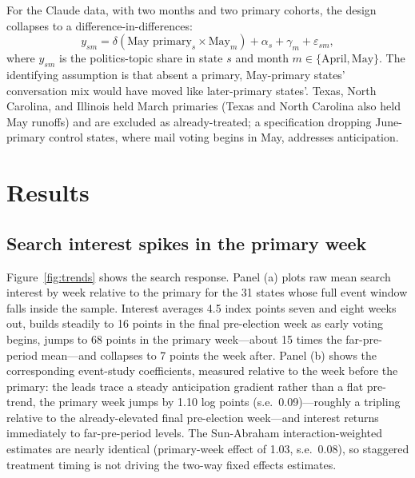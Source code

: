 \documentclass[12pt]{article}
\begin{document}
For the Claude data, with two months and two primary cohorts, the design collapses to a difference-in-differences:
\begin{equation}
y_{sm} = \delta \left(\text{May primary}_s \times \text{May}_m\right) + \alpha_s + \gamma_m + \varepsilon_{sm},
\end{equation}
where $y_{sm}$ is the politics-topic share in state $s$ and month $m \in \{\text{April}, \text{May}\}$. The identifying assumption is that absent a primary, May-primary states' conversation mix would have moved like later-primary states'. Texas, North Carolina, and Illinois held March primaries (Texas and North Carolina also held May runoffs) and are excluded as already-treated; a specification dropping June-primary control states, where mail voting begins in May, addresses anticipation.

\section*{Results}

\subsection*{Search interest spikes in the primary week}

Figure~\ref{fig:trends} shows the search response. Panel (a) plots raw mean search interest by week relative to the primary for the 31 states whose full event window falls inside the sample. Interest averages 4.5 index points seven and eight weeks out, builds steadily to 16 points in the final pre-election week as early voting begins, jumps to 68 points in the primary week---about 15 times the far-pre-period mean---and collapses to 7 points the week after. Panel (b) shows the corresponding event-study coefficients, measured relative to the week before the primary: the leads trace a steady anticipation gradient rather than a flat pre-trend, the primary week jumps by 1.10 log points (s.e.\ 0.09)---roughly a tripling relative to the already-elevated final pre-election week---and interest returns immediately to far-pre-period levels. The Sun-Abraham interaction-weighted estimates are nearly identical (primary-week effect of 1.03, s.e.\ 0.08), so staggered treatment timing is not driving the two-way fixed effects estimates.
\end{document}
